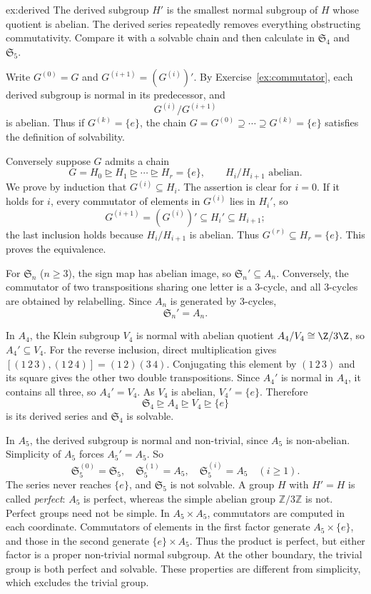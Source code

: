 \begin{solution}{ex:derived}
\idea The derived subgroup $H'$ is the smallest normal subgroup of $H$ whose quotient is abelian. The derived series repeatedly removes everything obstructing commutativity. Compare it with a solvable chain and then calculate in $\mathfrak S_4$ and $\mathfrak S_5$.

\writeup Write $G^{(0)}=G$ and $G^{(i+1)}=(G^{(i)})'$. By Exercise~\ref{ex:commutator}, each derived subgroup is normal in its predecessor, and
\[
G^{(i)}/G^{(i+1)}
\]
is abelian. Thus if $G^{(k)}=\{e\}$, the chain $G=G^{(0)}\supseteq\cdots\supseteq G^{(k)}=\{e\}$ satisfies the definition of solvability.

Conversely suppose $G$ admits a chain
\[
G=H_0\trianglerighteq H_1\trianglerighteq\cdots
\trianglerighteq H_r=\{e\},
\qquad H_i/H_{i+1}\text{ abelian}.
\]
We prove by induction that $G^{(i)}\subseteq H_i$. The assertion is clear for $i=0$. If it holds for $i$, every commutator of elements in $G^{(i)}$ lies in $H_i'$, so
\[
G^{(i+1)}=(G^{(i)})'\subseteq H_i'\subseteq H_{i+1};
\]
the last inclusion holds because $H_i/H_{i+1}$ is abelian. Thus $G^{(r)}\subseteq H_r=\{e\}$. This proves the equivalence.

For $\mathfrak S_n$ ($n\ge3$), the sign map has abelian image, so $\mathfrak S_n'\subseteq A_n$. Conversely, the commutator of two transpositions sharing one letter is a $3$-cycle, and all $3$-cycles are obtained by relabelling. Since $A_n$ is generated by $3$-cycles,
\[
\mathfrak S_n'=A_n.
\]

In $A_4$, the Klein subgroup $V_4$ is normal with abelian quotient $A_4/V_4\cong\Z/3\Z$, so $A_4'\subseteq V_4$. For the reverse inclusion, direct multiplication gives
$[(1\,2\,3),(1\,2\,4)]=(1\,2)(3\,4)$.
Conjugating this element by $(1\,2\,3)$ and its square gives the other
two double transpositions. Since $A_4'$ is normal in $A_4$, it contains
all three, so $A_4'=V_4$. As $V_4$ is abelian, $V_4'=\{e\}$. Therefore
\[
\boxed{\mathfrak S_4\trianglerighteq A_4
\trianglerighteq V_4\trianglerighteq\{e\}}
\]
is its derived series and $\mathfrak S_4$ is solvable.

In $A_5$, the derived subgroup is normal and non-trivial, since $A_5$ is non-abelian. Simplicity of $A_5$ forces $A_5'=A_5$. So
\[
\mathfrak S_5^{(0)}=\mathfrak S_5,\quad
\mathfrak S_5^{(1)}=A_5,\quad
\mathfrak S_5^{(i)}=A_5\quad(i\ge1).
\]
The series never reaches $\{e\}$, and $\mathfrak S_5$ is not solvable.
A group $H$ with $H'=H$ is called \emph{perfect}: $A_5$ is perfect,
whereas the simple abelian group $\mathbb Z/3\mathbb Z$ is not.
Perfect groups need not be simple. In $A_5\times A_5$, commutators are
computed in each coordinate. Commutators of elements in the first factor
generate $A_5\times\{e\}$, and those in the second generate
$\{e\}\times A_5$. Thus the product is perfect, but either factor is a
proper non-trivial normal subgroup. At the other boundary, the trivial
group is both perfect and solvable. These properties are different from
simplicity, which excludes the trivial group.
\end{solution}

